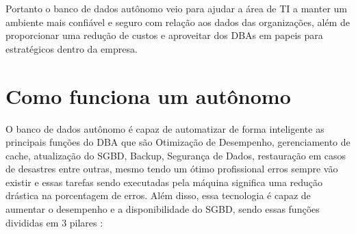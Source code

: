 Portanto o banco de dados autônomo veio para ajudar a área de TI a manter um ambiente mais confiável e seguro com relação aos dados das organizações, além de proporcionar uma redução de custos e aproveitar dos DBAs em papeis para estratégicos dentro da empresa.



\section{Como funciona um autônomo}

O banco de dados autônomo é capaz de automatizar de forma inteligente as principais funções do DBA que são Otimização de Desempenho, gerenciamento de cache, atualização do SGBD, Backup, Segurança de Dados, restauração em casos de desastres entre outras, mesmo tendo um ótimo profissional erros sempre vão existir e essas tarefas sendo executadas pela máquina significa uma redução drástica na porcentagem de erros. Além disso, essa tecnologia é capaz de aumentar o desempenho e a disponibilidade do SGBD, sendo essas funções divididas em 3 pilares \cite{OracleDBAutonomo}:


